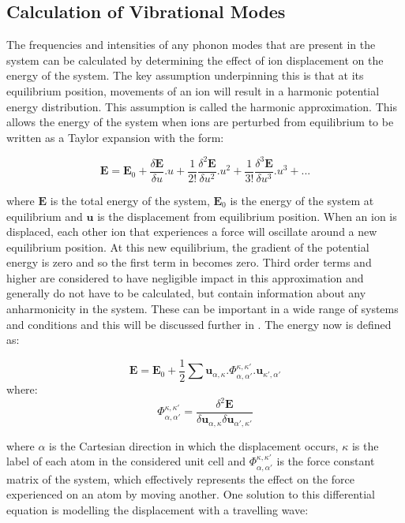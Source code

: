 \subsection{Calculation of Vibrational Modes}
\label{subsec:vibmodestheory}
The frequencies and intensities of any phonon modes that are present in the system can be calculated by determining the effect of ion displacement on the energy of the system. The key assumption underpinning this is that at its equilibrium position, movements of an ion will result in a harmonic potential energy distribution. This assumption is called the harmonic approximation. This allows the energy of the system when ions are perturbed from equilibrium to be written as a Taylor expansion with the form:

\begin{equation}
\boldsymbol{E} = \boldsymbol{E}_0 + \frac{\delta \boldsymbol{E}}{\delta u}.u + \frac{1}{2!} \frac{\delta^2 \boldsymbol{E}}{\delta u^2}.u^2 + \frac{1}{3!} \frac{\delta^3 \boldsymbol{E}}{\delta u^3}.u^3 + ...
\label{eqn:ETaylor}
\end{equation}

where \(\boldsymbol{E}\) is the total energy of the system, \(\boldsymbol{E}_0\) is the energy of the system at equilibrium  and \(\boldsymbol{u}\) is the displacement from equilibrium position. When an ion is displaced, each other ion that experiences a force will oscillate around a new equilibrium position. At this new equilibrium, the gradient of the potential energy is zero and so the first term in  becomes zero. Third order terms and higher are considered to have negligible impact in this approximation and generally do not have to be calculated, but contain information about any anharmonicity in the system. These can be important in a wide range of systems and conditions and this will be discussed further in . The energy now is defined as:

\begin{equation}
\boldsymbol{E} = \boldsymbol{E}_0 + \frac{1}{2} \sum \boldsymbol{u}_{\alpha, \kappa}.\Phi_{\alpha, \alpha'}^{\kappa, \kappa'}.\boldsymbol{u}_{\kappa', \alpha'}
\end{equation}
where:
\begin{equation}
\Phi_{\alpha, \alpha'}^{\kappa, \kappa'} =  \frac{\delta^2 \boldsymbol{E}}{\delta \boldsymbol{u}_{\alpha, \kappa} \delta \boldsymbol{u}_{\alpha', \kappa'}}
\end{equation}

where \(\alpha\) is the Cartesian direction in which the displacement occurs, \(\kappa\) is the label of each atom in the considered unit cell and \(\Phi_{\alpha, \alpha'}^{\kappa, \kappa'}\) is the force constant matrix of the system, which effectively represents the effect on the force experienced on an atom by moving another. One solution to this differential equation is modelling the displacement with a travelling wave:

